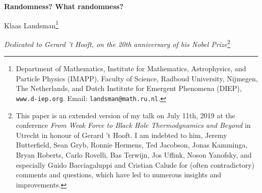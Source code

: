 \documentclass[12pt]{article}
\numberwithin{equation}{section}
\begin{document}
 
 \setlength{\unitlength}{1cm}\cleardoublepage
\date\nodate
\begin{center}
\begin{huge}
{\bf Randomness? What randomness?}
\end{huge}
\bigskip

\bigskip

\renewcommand{\thefootnote}{\alph{footnote}}
\begin{Large}
 Klaas Landsman\footnote{Department of Mathematics, 
Institute for Mathematics, Astrophysics, and Particle Physics (IMAPP), Faculty of Science, Radboud University, Nijmegen, The Netherlands, and Dutch Institute for Emergent Phenomena (DIEP), \texttt{www.d-iep.org}.
Email:
\texttt{landsman@math.ru.nl}.}
\end{Large}
\bigskip


\begin{large}
\emph{Dedicated to Gerard 't Hooft, on the 20th anniversary of his Nobel Prize}\footnote{This paper is an extended version of my talk on July 11th, 2019 at the conference \emph{From Weak Force to Black Hole Thermodynamics and Beyond} in Utrecht in honour of Gerard 't Hooft. I am indebted to him,  Jeremy Butterfield,  Sean Gryb, Ronnie Hermens, Ted Jacobson, Jonas Kamminga, Bryan Roberts, Carlo Rovelli, Bas Terwijn,  Jos Uffink,  Noson Yanofsky, and especially Guido Bacciagaluppi and Cristian Calude for (often contradictory) comments and questions, which have led to numerous  insights and improvements.  }
\end{large}
\end{center}
\bigskip

 \begin{abstract} 
\noindent 
This is a review of the issue of randomness in quantum mechanics, with special emphasis on its ambiguity; for example, randomness has different antipodal relationships to  determinism, computability, and compressibility. Following a (Wittgensteinian) philosophical discussion of randomness in general, I 
 argue that deterministic interpretations of quantum mechanics (like Bohmian mechanics or 't Hooft's Cellular Automaton interpretation) are strictly speaking incompatible with the Born rule.  
I also stress the role of outliers, i.e.\ measurement outcomes that are \emph{not} 1-random. Although these occur with low (or even zero) probability, their very existence implies  that the no-signaling principle used in proofs of randomness of outcomes of quantum-mechanical measurements (and of the safety of quantum cryptography) should be reinterpreted statistically, like the second law of thermodynamics. In three appendices I 
discuss the Born rule and its status in both single and repeated experiments,  review the notion of 1-randomness (or algorithmic randomness) that in various guises was investigated by Solomonoff, Kolmogorov, Chaitin, Martin-L\"{o}f, Schnorr, and others, and treat Bell's (1964) Theorem and the Free Will Theorem with their implications for randomness.  
\end{abstract}
\thispagestyle{empty}
\end{document}

